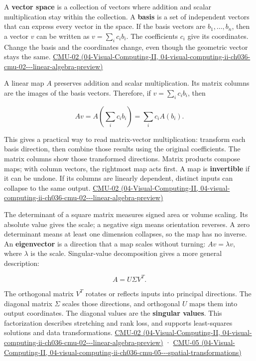A \textbf{vector space} is a collection of vectors where addition and scalar multiplication stay within the collection. A \textbf{basis} is a set of independent vectors that can express every vector in the space. If the basis vectors are \(b_1,\ldots,b_n\), then a vector \(v\) can be written as \(v=\sum_i c_i b_i\). The coefficients \(c_i\) give its coordinates. Change the basis and the coordinates change, even though the geometric vector stays the same. \href{../04-Visual-Computing-II/main.pdf\#nameddest=04-visual-computing-ii-ch036-cmu-02---linear-algebra-preview}{CMU-02 (04-Visual-Computing-II, 04-visual-computing-ii-ch036-cmu-02-\/-\/-linear-algebra-preview)}

A linear map \(A\) preserves addition and scalar multiplication. Its matrix columns are the images of the basis vectors. Therefore, if \(v=\sum_i c_i b_i\), then

\[
Av=A\left(\sum_i c_i b_i\right)=\sum_i c_iA(b_i).
\]

This gives a practical way to read matrix-vector multiplication: transform each basis direction, then combine those results using the original coefficients. The matrix columns show those transformed directions. Matrix products compose maps; with column vectors, the rightmost map acts first. A map is \textbf{invertible} if it can be undone. If its columns are linearly dependent, distinct inputs can collapse to the same output. \href{../04-Visual-Computing-II/main.pdf\#nameddest=04-visual-computing-ii-ch036-cmu-02---linear-algebra-preview}{CMU-02 (04-Visual-Computing-II, 04-visual-computing-ii-ch036-cmu-02-\/-\/-linear-algebra-preview)}

The determinant of a square matrix measures signed area or volume scaling. Its absolute value gives the scale; a negative sign means orientation reverses. A zero determinant means at least one dimension collapses, so the map has no inverse. An \textbf{eigenvector} is a direction that a map scales without turning: \(Av=\lambda v\), where \(\lambda\) is the scale. Singular-value decomposition gives a more general description:

\[
A=U\Sigma V^T.
\]

The orthogonal matrix \(V^T\) rotates or reflects inputs into principal directions. The diagonal matrix \(\Sigma\) scales those directions, and orthogonal \(U\) maps them into output coordinates. The diagonal values are the \textbf{singular values}. This factorization describes stretching and rank loss, and supports least-squares solutions and data transformations. \href{../04-Visual-Computing-II/main.pdf\#nameddest=04-visual-computing-ii-ch036-cmu-02---linear-algebra-preview}{CMU-02 (04-Visual-Computing-II, 04-visual-computing-ii-ch036-cmu-02-\/-\/-linear-algebra-preview)} · \href{../04-Visual-Computing-II/main.pdf\#nameddest=04-visual-computing-ii-ch036-cmu-05---spatial-transformations}{CMU-05 (04-Visual-Computing-II, 04-visual-computing-ii-ch036-cmu-05-\/-\/-spatial-transformations)}

